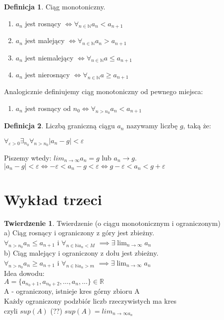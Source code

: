 \documentclass{article}
\theoremstyle{definition}
\newtheorem{de}{Definicja}[subsection]
\theoremstyle{definition}
\newtheorem{tw}{Twierdzenie}[subsection]
\theoremstyle{definition}
\theoremstyle{definition}
\begin{document}
\begin{de}
    Ciąg monotoniczny. 
    \begin{enumerate}
        \item $a_n$ jest rosnący $\iff \forall_{n\in\mathbb{N}} a_n<a_{n+1}$
        \item $a_n$ jest malejący $\iff \forall_{n\in\mathbb{N}} a_n>a_{n+1}$
        \item $a_n$ jest niemalejący $\iff \forall_{n\in\mathbb{N}} a\leq a_{n+1}$
        \item $a_n$ jest nierosnący $\iff \forall_{n\in\mathbb{N}} a\geq a_{n+1}$
    \end{enumerate}
    Analogicznie definiujemy ciąg monotoniczny od pewnego miejsca:
    \begin{enumerate}
        \item $a_n$ jest rosnący od $n_0 \iff \forall_{n>n_0} a_n<a_{n+1}$
    \end{enumerate}
\end{de}

\begin{de}
    Liczbą graniczną ciągu $a_n$ nazywamy liczbę $g$, taką że:
    \begin{center}
        $\forall_{\varepsilon>0}\exists_{n_0}\forall_{n>n_0} |a_n-g|<\varepsilon$
    \end{center}
    Piszemy wtedy: $lim_{n\rightarrow \infty} a_n = g$ lub $a_n\rightarrow g$.\\
    $|a_n-g|<\varepsilon \iff -\varepsilon < a_n -g < \varepsilon \iff g-\varepsilon < a_n < g+\varepsilon$
\end{de}

\section{Wykład trzeci}

\begin{tw}
Twierdzenie (o ciągu monotonicznym i ograniczonym)\\
a) Ciąg rosnący i ograniczony z góry jest zbieżny.\\
$\forall_{n>n_0} a_n\leq a_{n+1}$ i $\forall_{n\in \mathbb{N} a_n< M}$ $\implies \exists \lim_{n\rightarrow \infty} a_n$\\
b) Ciąg malejący i ograniczony z dołu jest zbieżny.\\
$\forall_{n>n_0} a_n\geq a_{n+1}$ i $\forall_{n\in \mathbb{N} a_n> m}$ $\implies \exists \lim_{n\rightarrow \infty} a_n$\\
Idea dowodu:\\
$A=\{a_{n_0+1},a_{n_0+2},\dots,a_n,\dots\} \in \mathbb{R}$\\
A - ograniczony, istnieje kres górny zbioru A\\
Każdy ograniczony podzbiór liczb rzeczywistych ma kres\\
czyli $sup(A)$ (??) $sup(A)=lim_{n\rightarrow \infty a_n}$
\end{tw}
\end{document}
